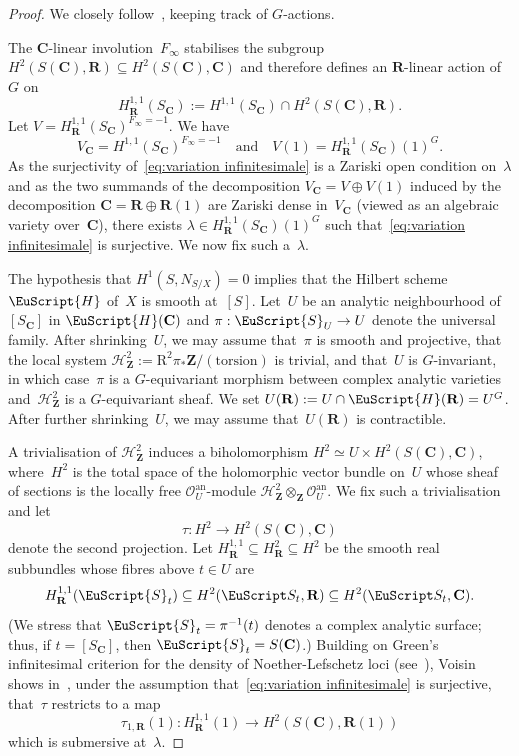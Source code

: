 \documentclass[JEP,XML,SOM,Unicode]{cedram}
\let\mathcal\EuScript
\theoremstyle{plain}
\theoremstyle{definition}
\numberwithin{equation}{section}
\newcommand{\sH}{{\mathscr H}}
\newcommand{\sO}{{\mathscr O}}
\renewcommand{\C}{{\mathbf C}}
\newcommand{\R}{{\mathbf R}}
\newcommand{\Z}{{\mathbf Z}}
\newcommand{\torsion}{(\mathrm{torsion})}
\newcommand{\RR}{{\mathrm{R}}}
\begin{document}
\begin{proof}
We closely follow~\cite[]{voisinthreefolds}, keeping track of $G$-actions.

The $\C$\nobreakdash-linear involution~$F_\infty$ stabilises the subgroup $H^2(S(\C),\R)\subseteq H^2(S(\C),\C)$
and therefore defines an $\R$\nobreakdash-linear action of~$G$ on
\[
H^{1,1}_{\R}(S_{\C}):=H^{1,1}(S_{\C})\cap H^2(S(\C),\R).
\]
Let $V=H^{1,1}_\R(S_\C)^{F_\infty=-1}$.
We have
\[
V_\C=H^{1,1}(S_\C)^{F_\infty=-1}\quad\text{and}\quad V(1)=H^{1,1}_\R(S_\C)(1)^G.
\]
As the surjectivity of~\eqref{eq:variation infinitesimale}
is a Zariski open condition on~$\lambda$
and as the two summands of the decomposition
$V_\C=V \oplus V(1)$ induced by the decomposition \hbox{$\C=\R\oplus\R(1)$} are Zariski dense in~$V_\C$
(viewed as an algebraic variety over~$\C$),
there exists
\hbox{$\lambda\in H^{1,1}_{\R}(S_{\C})(1)^G$} such that~\eqref{eq:variation infinitesimale}
is surjective. We now fix such a~$\lambda$.

The hypothesis that $H^1(S,N_{S/X})=0$ implies that the Hilbert scheme~$\mathcal{H}$ of~$X$ is smooth at~$[S]$.
Let~$U$ be an analytic neighbourhood of~$[S_{\C}]$ in $\mathcal{H}(\C)$
and $\pi:\mathcal{S}_U \to U$ denote the universal family.
After shrinking~$U$,
we may assume that~$\pi$ is smooth and projective,
that the local system $\sH^2_\Z:=\RR^2\pi_*\Z/\torsion$ is trivial,
and that~$U$ is $G$\nobreakdash-invariant,
in which case~$\pi$ is a $G$\nobreakdash-equivariant morphism
between complex analytic varieties
and~$\sH^2_\Z$ is a $G$\nobreakdash-equivariant sheaf.
We set $U(\R):=U\cap \mathcal{H}(\R)=U^G$.
After further shrinking~$U$, we may assume that~$U(\R)$ is contractible.

A trivialisation of $\sH^2_{\Z}$ induces a biholomorphism $H^2\simeq U\times H^2(S(\C),\C)$, where~$H^2$ is
the total space of the holomorphic vector bundle on~$U$ whose sheaf of sections is the locally free $\sO_U^{\mathrm{an}}$\nobreakdash-module
$\sH^2_\Z \otimes_\Z \sO_U^{\mathrm{an}}$.
We fix such a trivialisation and let
\[
\tau: H^2\to H^2(S(\C),\C)
\]
denote the second projection.
Let $H^{1,1}_{\R}\subseteq H^2_\R \subseteq H^2$
be the smooth real subbundles
whose fibres above $t\in U$ are
\[
H^{1,1}_{\R}(\mathcal{S}_t) \subseteq H^2(\mathcal S_t,\R) \subseteq H^2(\mathcal S_t,\C).
\]
(We stress that $\mathcal{S}_t=\pi^{-1}(t)$ denotes a complex analytic surface;
thus, if $t=[S_\C]$, then $\mathcal{S}_t=S(\C)$.)
Building on Green's
infinitesimal criterion for the density of Noether-Lefschetz loci
(see~\cite[Prop.\,17.20]{voisinbook}),
Voisin shows in~\cite[p.\,48]{voisinthreefolds},
under the assumption that~\eqref{eq:variation infinitesimale}
is surjective,
that~$\tau$ restricts to a map
\[
\tau_{1,\R}(1):H^{1,1}_\R(1)\to H^2(S(\C),\R(1))
\]
which is submersive at~$\lambda$.


\end{proof}
\end{document}
